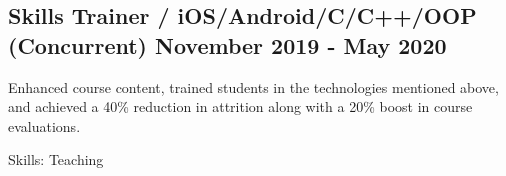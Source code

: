\subsection{{Skills Trainer / iOS/Android/C/C++/OOP (Concurrent) \hfill November 2019 - May 2020}}
\begin{zitemize}

\item Enhanced course content, trained students in the technologies mentioned above, and achieved a 40\% reduction in attrition along with a 20\% boost in course evaluations.

\item[] Skills: Teaching

\end{zitemize}